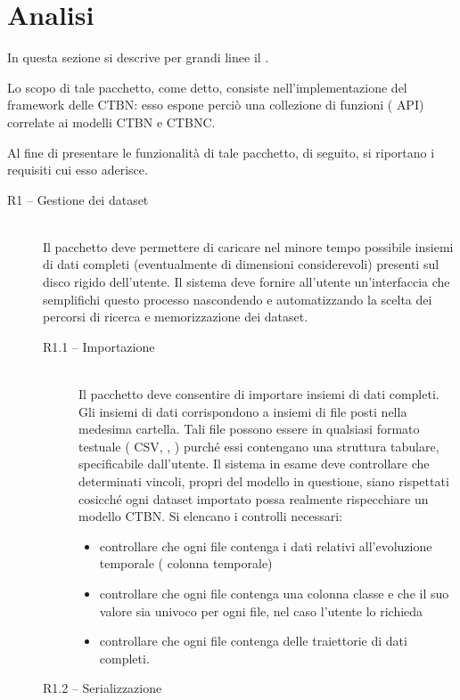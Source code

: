 \section{Analisi}\label{sec:rctbn-describ}
In questa sezione si descrive per grandi linee il \pacchettor{}.

Lo scopo di tale pacchetto, come detto, consiste nell'implementazione del framework delle \acs{CTBN}: esso espone perciò una collezione di funzioni (\ie{} \acs{API}) correlate ai modelli \acs{CTBN} e \acs{CTBNC}.

Al fine di presentare le funzionalità di tale pacchetto, di seguito, si riportano i requisiti cui esso aderisce.
\begin{description}
	\item[R1 -- Gestione dei dataset] \hfill \\
	Il pacchetto deve permettere di caricare nel minore tempo possibile insiemi di dati completi (eventualmente di dimensioni considerevoli) presenti sul disco rigido dell'utente. Il sistema deve fornire all'utente un'interfaccia che semplifichi questo processo nascondendo e automatizzando la scelta dei percorsi di ricerca e memorizzazione dei dataset.
		\begin{description}
		\item[R1.1 -- Importazione] \hfill \\
		Il pacchetto deve consentire di importare insiemi di dati completi. Gli insiemi di dati corrispondono a insiemi di file posti nella medesima cartella. Tali file possono essere in qualsiasi formato testuale (\eg{} \acs{CSV}, , ) purché essi contengano una struttura tabulare, specificabile dall'utente. Il sistema in esame deve controllare che determinati vincoli, propri del modello in questione, siano rispettati cosicché ogni dataset importato possa realmente rispecchiare un modello \acs{CTBN}. Si elencano i controlli necessari:
		\begin{itemize}
			\item controllare che ogni file contenga i dati relativi all'evoluzione temporale (\ie{} colonna temporale)
			\item controllare che ogni file contenga una colonna classe e che il suo valore sia univoco per ogni file, nel caso l'utente lo richieda
			\item controllare che ogni file contenga delle traiettorie di dati completi.
		\end{itemize}
		\item[R1.2 -- Serializzazione] \hfill \\

\end{description}
\end{description}
